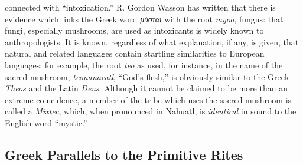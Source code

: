 connected with \enquote{intoxication.} R. Gordon Wasson has written
that there is evidence which links the Greek word \emph{μύσται} with
the root \emph{myoo}, fungus: that fungi, especially mushrooms, are
used as intoxicants is widely known to anthropologists.
It is known, regardless of what explanation, if any, is
given, that natural and related languages contain startling
similarities to European languages; for example, the root
\emph{teo} as used, for instance, in the name of the sacred mushroom,
\emph{teonanacatl}, \enquote{God's flesh,} is obviously similar to the Greek
\emph{Theos} and the Latin \emph{Deus}. Although it cannot be claimed to
be more than an extreme coincidence, a member of the tribe
which uses the sacred mushroom is called a \emph{Mixtec}, which, when
pronounced in Nahuatl, is \emph{identical} in sound to the English
word \enquote{mystic.}

\subsection{Greek Parallels to the Primitive Rites}

